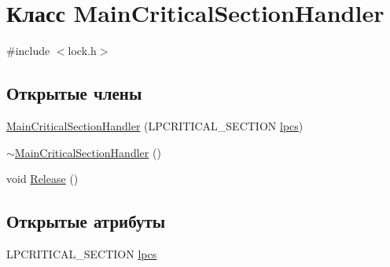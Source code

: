 \hypertarget{class_main_critical_section_handler}{\section{Класс Main\-Critical\-Section\-Handler}
\label{class_main_critical_section_handler}
}


{\ttfamily \#include $<$lock.\-h$>$}

\subsection*{Открытые члены}
\begin{DoxyCompactItemize}
\item 
\hyperlink{class_main_critical_section_handler_afceb885a7c66f1eb7270b663aa291732}{Main\-Critical\-Section\-Handler} (L\-P\-C\-R\-I\-T\-I\-C\-A\-L\-\_\-\-S\-E\-C\-T\-I\-O\-N \hyperlink{class_main_critical_section_handler_ae7635d9e5c74721475bf7fbc813e8895}{lpcs})
\item 
\hyperlink{class_main_critical_section_handler_a4f4ebed60b264bd98256363f76285412}{$\sim$\-Main\-Critical\-Section\-Handler} ()
\item 
void \hyperlink{class_main_critical_section_handler_acb1a97f209ca5ebdef5370f514b5b074}{Release} ()
\end{DoxyCompactItemize}
\subsection*{Открытые атрибуты}
\begin{DoxyCompactItemize}
\item 
L\-P\-C\-R\-I\-T\-I\-C\-A\-L\-\_\-\-S\-E\-C\-T\-I\-O\-N \hyperlink{class_main_critical_section_handler_ae7635d9e5c74721475bf7fbc813e8895}{lpcs}
\end{DoxyCompactItemize}



